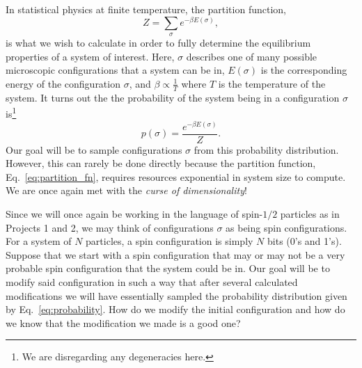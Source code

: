 \documentclass[12pt]{article}
\begin{document}
In statistical physics at finite temperature, the partition function, 
\begin{equation} \label{eq:partition_fn}
    Z = \sum_{\sigma} e^{-\beta E(\sigma)},
\end{equation}
is what we wish to calculate in order to fully determine the equilibrium properties of a system of interest. Here, $\sigma$ describes one of many possible microscopic configurations that a system can be in, $E(\sigma)$ is the corresponding energy of the configuration $\sigma$, and $\beta \propto \frac{1}{T}$ where $T$ is the temperature of the system. It turns out the the probability of the system being in a configuration $\sigma$ is\footnote{We are disregarding any degeneracies here.}
\begin{equation} \label{eq:probability}
    p(\sigma) = \frac{e^{-\beta E(\sigma)}}{Z}.
\end{equation}
Our goal will be to sample configurations $\sigma$ from this probability distribution. However, this can rarely be done directly because the partition function, Eq.~\eqref{eq:partition_fn}, requires resources exponential in system size to compute. We are once again met with the {\it curse of dimensionality}!

Since we will once again be working in the language of spin-$1/2$ particles as in Projects 1 and 2, we may think of configurations $\sigma$ as being spin configurations. For a system of $N$ particles, a spin configuration is simply $N$ bits (0's and 1's). Suppose that we start with a spin configuration that may or may not be a very probable spin configuration that the system could be in. Our goal will be to modify said configuration in such a way that after several calculated modifications we will have essentially sampled the probability distribution given by Eq.~\eqref{eq:probability}. How do we modify the initial configuration and how do we know that the modification we made is a good one?
\end{document}
